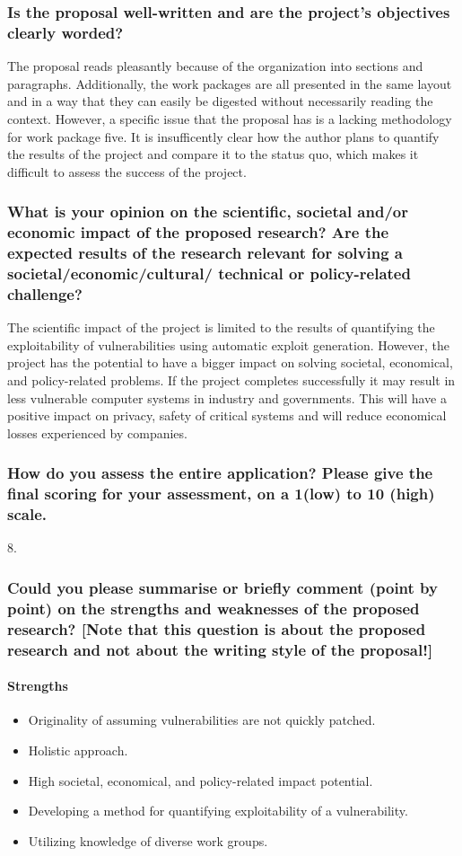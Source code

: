 \subsubsection*{Is the proposal well-written and are the project’s objectives clearly worded?}
The proposal reads pleasantly because of the organization into sections and paragraphs. Additionally, the work packages are all presented in the same layout and in a way that they can easily be digested without necessarily reading the context. However, a specific issue that the proposal has is a lacking methodology for work package five. It is insufficently clear how the author plans to quantify the results of the project and compare it to the status quo, which makes it difficult to assess the success of the project.

\subsubsection*{What is your opinion on the scientific, societal and/or economic impact of the proposed research? Are the expected results of the research relevant for solving a societal/economic/cultural/ technical or policy-related challenge?}
The scientific impact of the project is limited to the results of quantifying the exploitability of vulnerabilities using automatic exploit generation. However, the project has the potential to have a bigger impact on solving societal, economical, and policy-related problems. If the project completes successfully it may result in less vulnerable computer systems in industry and governments. This will have a positive impact on privacy, safety of critical systems and will reduce economical losses experienced by companies.

\subsubsection*{How do you assess the entire application? Please give the final scoring for your assessment, on a 1(low) to 10 (high) scale.}
8.

\subsubsection*{Could you please summarise or briefly comment (point by point) on the strengths and weaknesses of the proposed research? [Note that this question is about the proposed research and not about the writing style of the proposal!]}
\paragraph{Strengths}
\begin{itemize}
    \item Originality of assuming vulnerabilities are not quickly patched.
    \item Holistic approach.
    \item High societal, economical, and policy-related impact potential.
    \item Developing a method for quantifying exploitability of a vulnerability.
    \item Utilizing knowledge of diverse work groups.
\end{itemize}

